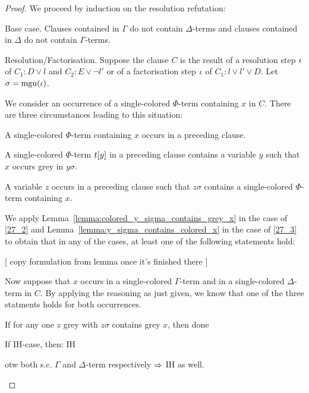 \documentclass[,%
	draft=false,%
	numbers=noendperiod
	11pt,
	a4paper,
	oneside,%
	openany,
]{memoir}
\begin{document}
\begin{proof}
	We proceed by induction on the resolution refutation:

	\begin{description}
		\item{}Base case.
			Clauses contained in $\Gamma$ do not contain $\Delta$-terms and clauses contained in $\Delta$ do not contain $\Gamma$-terms.

		\item{}Resolution/Factorisation.
			Suppose the clause $C$ is the result of a resolution step $\iota$ of $C_1: D \lor l$ and $C_2: E \lor \lnot l'$
			or of a factorisation step $\iota$ of $C_1: l \lor l' \lor D$.
			Let $\sigma = \operatorname{mgu}(\iota)$. 


			We consider an occurrence of a single-colored $\Phi$-term containing $x$ in $C$.
			There are three circumstances leading to this situation:
			\begin{compactenum}
				\item A single-colored $\Phi$-term containing $x$ occurs in a preceding clause.
				\item A single-colored $\Phi$-term $t[y]$ in a preceding clause contains a variable $y$ such that $x$ occurs grey in $y\sigma$. \label{27_2}
				\item A variable $z$ occurs in a preceding clause such that $z\sigma$ contains a single-colored $\Phi$-term containing $x$. \label{27_3}
			\end{compactenum}

			We apply Lemma~\ref{lemma:colored_y_sigma_contains_grey_x} in the case of \ref{27_2} and
			Lemma~\ref{lemma:y_sigma_contains_colored_x} in the case of \ref{27_3} to obtain that in any of the cases, at least one of the following statements hold:

			[ copy formulation from lemma once it's finished there ]

			Now suppose that $x$ occurs in a single-colored $\Gamma$-term and in a single-colored $\Delta$-term in $C$.
			By applying the reasoning as just given, we know that one of the three statments holds for both occurrences. 

			If for any one $z$ grey with $z\sigma$ contains grey $x$, then done

			If IH-case, then: IH

			otw both s.c. $\Gamma$ and $\Delta$-term respectively $\Rightarrow$ IH as well.
			\qedhere

	\end{description}
\end{proof}
\end{document}
